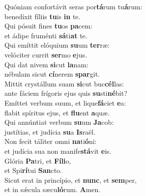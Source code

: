 \evenverse Quóniam confortávit seras por\textbf{tá}rum tu\textbf{á}rum:~\*\\
\evenverse benedíxit fíliis \textbf{tu}is \textbf{in} te.\\
\oddverse Qui pósuit fines \textbf{tu}os \textbf{pa}cem:~\*\\
\oddverse et ádipe fruménti \textbf{sá}ti\textbf{at} te.\\
\evenverse Qui emíttit elóquium \textbf{su}um \textbf{ter}ræ:~\*\\
\evenverse velóciter currit \textbf{ser}mo \textbf{e}jus.\\
\oddverse Qui dat nivem \textbf{si}cut \textbf{la}nam:~\*\\
\oddverse nébulam sicut \textbf{cí}nerem \textbf{spar}git.\\
\evenverse Mittit crystállum suam \textbf{si}cut buc\textbf{cél}las:~\*\\
\evenverse ante fáciem frígoris ejus quis \textbf{su}sti\textbf{né}bit?\\
\oddverse Emíttet verbum suum, et lique\textbf{fá}ciet \textbf{e}a:~\*\\
\oddverse flabit spíritus ejus, et \textbf{flu}ent \textbf{a}quæ.\\
\evenverse Qui annúntiat verbum \textbf{su}um \textbf{Ja}cob:~\*\\
\evenverse justítias, et judícia \textbf{su}a \textbf{Is}raël.\\
\oddverse Non fecit táliter omni \textbf{na}ti\textbf{ó}ni:~\*\\
\oddverse et judícia sua non manife\textbf{stá}vit \textbf{e}is.\\
\evenverse Glória \textbf{Pa}tri, et \textbf{Fí}\textbf{li}o,~\*\\
\evenverse et Spi\textbf{rí}tui \textbf{San}cto.\\
\oddverse Sicut erat in princípio, et \textbf{nunc}, et \textbf{sem}per,~\*\\
\oddverse et in sǽcula sæcu\textbf{ló}rum. \textbf{A}men.\\
